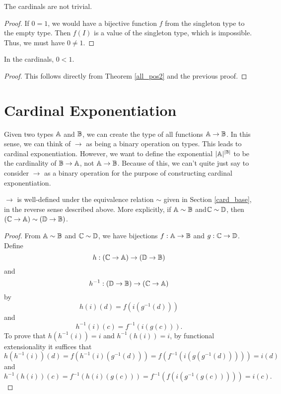 \documentclass[../../math.tex]{subfiles}
\begin{document}
\begin{instance} \label{card_not_trivial}
    The cardinals are not trivial.
\end{instance}
\begin{proof}
    If $0 = 1$, we would have a bijective function $f$ from the singleton type
    to the empty type.  Then $f(I)$ is a value of the singleton type, which is
    impossible.  Thus, we must have $0 \neq 1$.
\end{proof}

\begin{theorem} \label{card_one_pos}
    In the cardinals, $0 < 1$.
\end{theorem}
\begin{proof}
    This follows directly from Theorem \ref{all_pos2} and the previous proof.
\end{proof}

\section{Cardinal Exponentiation}

Given two types $\mathbb{A}$ and $\mathbb{B}$, we can create the type of all functions $\mathbb{A} \to
\mathbb{B}$.  In this sense, we can think of $\to$ as being a binary operation on types.
This leads to cardinal exponentiation.  However, we want to define the
exponential $|\mathbb{A}|^{|\mathbb{B}|}$ to be the cardinality of $\mathbb{B} \to \mathbb{A}$, not $\mathbb{A} \to \mathbb{B}$.
Because of this, we can't quite just say to consider $\to$ as a binary
operation for the purpose of constructing cardinal exponentiation.

\begin{lemma}
    $\to$ is well-defined under the equivalence relation $\sim$ given in Section
    \ref{card_base}, in the reverse sense described above.  More explicitly, if
    $\mathbb{A} \sim \mathbb{B}$ and$\mathbb{C} \sim \mathbb{D}$, then $(\mathbb{C} \to \mathbb{A}) \sim (\mathbb{D} \to \mathbb{B})$.
\end{lemma}
\begin{proof}
    From $\mathbb{A} \sim \mathbb{B}$ and $\mathbb{C} \sim \mathbb{D}$, we have bijections $f : \mathbb{A} \to \mathbb{B}$ and
    $g : \mathbb{C} \to \mathbb{D}$.  Define
    \[
        h : (\mathbb{C} \to \mathbb{A}) \to (\mathbb{D} \to \mathbb{B})
    \]
    and
    \[
        h^{-1} : (\mathbb{D} \to \mathbb{B}) \to (\mathbb{C} \to \mathbb{A})
    \]
    by
    \[
        h(i)(d) = f(i(g^{-1}(d)))
    \]
    and
    \[
        h^{-1}(i)(c) = f^{-1}(i(g(c))).
    \]
    To prove that $h(h^{-1}(i)) = i$ and $h^{-1}(h(i)) = i$, by functional
    extensionality it suffices that
    \[
        h(h^{-1}(i))(d)
        = f(h^{-1}(i)(g^{-1}(d)))
        = f(f^{-1}(i(g(g^{-1}(d)))))
        = i(d)
    \]
    and
    \[
        h^{-1}(h(i))(c)
        = f^{-1}(h(i)(g(c)))
        = f^{-1}(f(i(g^{-1}(g(c)))))
        = i(c).
    \]
\end{proof}
\end{document}
